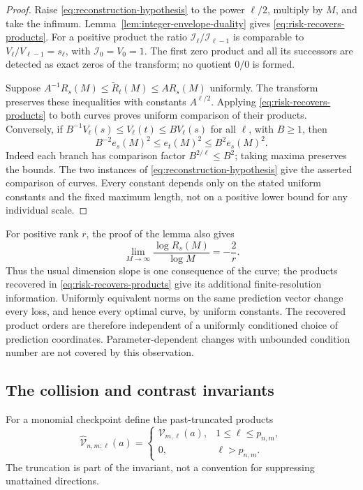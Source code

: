 \begin{proof}
Raise \eqref{eq:reconstruction-hypothesis} to the power $\ell/2$,
multiply by $M$, and take the infimum. Lemma~\ref{lem:integer-envelope-duality}
gives \eqref{eq:risk-recovers-products}. For a positive product the
ratio $\mathcal I_\ell/\mathcal I_{\ell-1}$ is comparable to
$V_\ell/V_{\ell-1}=s_\ell$, with $\mathcal I_0=V_0=1$.
The first zero product and all its successors are detected as exact
zeros of the transform; no quotient $0/0$ is formed.

Suppose $A^{-1}R_s(M)\le\widetilde R_t(M)\le A R_s(M)$ uniformly.
The transform preserves these inequalities with constants $A^{\ell/2}$.
Applying \eqref{eq:risk-recovers-products} to both curves proves uniform
comparison of their products. Conversely, if
$B^{-1}V_\ell(s)\le V_\ell(t)\le B V_\ell(s)$ for all $\ell$,
with $B\ge1$, then
\[
 B^{-2}e_s(M)^2\le e_t(M)^2\le B^2e_s(M)^2.
\]
Indeed each branch has comparison factor $B^{2/\ell}\le B^2$;
taking maxima preserves the bounds. The two instances of
\eqref{eq:reconstruction-hypothesis} give the asserted comparison of
curves. Every constant depends only on the stated uniform constants
and the fixed maximum length, not on a positive lower bound for any
individual scale.
\end{proof}

For positive rank $r$, the proof of the lemma also gives
\[
 \lim_{M\to\infty}\frac{\log R_s(M)}{\log M}=-\frac2r.
\]
Thus the usual dimension slope is one consequence of the curve; the
products recovered in \eqref{eq:risk-recovers-products} give its
additional finite-resolution information. Uniformly equivalent norms
on the same prediction vector change every loss, and hence every
optimal curve, by uniform constants. The recovered product orders are
therefore independent of a uniformly conditioned choice of prediction
coordinates. Parameter-dependent changes with unbounded condition
number are not covered by this observation.

\subsection{The collision and contrast invariants}
For a monomial checkpoint define the past-truncated products
\[
 \widehat{\mathcal V}_{n,m;\ell}(a)=
 \begin{cases}
  \mathcal V_{m,\ell}(a),&1\le\ell\le p_{n,m},\\
  0,&\ell>p_{n,m}.
 \end{cases}
\]
The truncation is part of the invariant, not a convention for suppressing
unattained directions.


